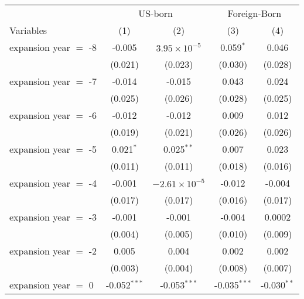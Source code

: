 \documentclass[
]{article}
\let\origtable\table
\let\endorigtable\endtable
\renewenvironment{table}[1][ht]{
      \expandafter\origtable\expandafter[H]
    }{
      \endorigtable
    }
\begin{document}
\begin{table}[htbp]
   \caption{The Impact of Medicaid Expansion on Uninsured Rate }
   \centering
   \small
   \begin{tabular}{lcccc}
      \tabularnewline \midrule \midrule
       & \multicolumn{2}{c}{US-born} & \multicolumn{2}{c}{Foreign-Born} \\ \cmidrule(lr){2-3} \cmidrule(lr){4-5}
      Variables             & (1)            & (2)                    & (3)            & (4)\\  
      \midrule 
      expansion year $=$ -8 & -0.005         & $3.95\times 10^{-5}$   & 0.059$^{*}$    & 0.046\\   
                            & (0.021)        & (0.023)                & (0.030)        & (0.028)\\   
      expansion year $=$ -7 & -0.014         & -0.015                 & 0.043          & 0.024\\   
                            & (0.025)        & (0.026)                & (0.028)        & (0.025)\\   
      expansion year $=$ -6 & -0.012         & -0.012                 & 0.009          & 0.012\\   
                            & (0.019)        & (0.021)                & (0.026)        & (0.026)\\   
      expansion year $=$ -5 & 0.021$^{*}$    & 0.025$^{**}$           & 0.007          & 0.023\\   
                            & (0.011)        & (0.011)                & (0.018)        & (0.016)\\   
      expansion year $=$ -4 & -0.001         & $-2.61\times 10^{-5}$  & -0.012         & -0.004\\   
                            & (0.017)        & (0.017)                & (0.016)        & (0.017)\\   
      expansion year $=$ -3 & -0.001         & -0.001                 & -0.004         & 0.0002\\   
                            & (0.004)        & (0.005)                & (0.010)        & (0.009)\\   
      expansion year $=$ -2 & 0.005          & 0.004                  & 0.002          & 0.002\\   
                            & (0.003)        & (0.004)                & (0.008)        & (0.007)\\   
      expansion year $=$ 0  & -0.052$^{***}$ & -0.053$^{***}$         & -0.035$^{***}$ & -0.030$^{**}$\\   

\end{tabular}
\end{table}
\end{document}

